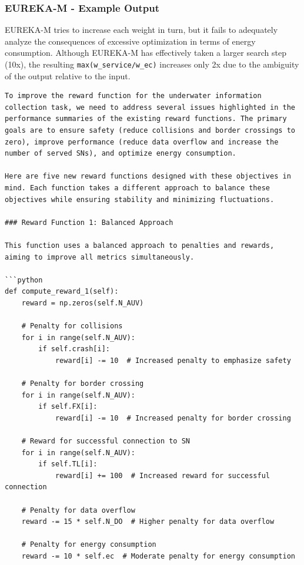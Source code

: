 \documentclass{article}
\begin{document}
\subsubsection{EUREKA-M - Example Output}
EUREKA-M tries to increase each weight in turn, but it fails to adequately analyze the consequences of excessive optimization in terms of energy consumption. Although EUREKA-M has effectively taken a larger search step (10x), the resulting \verb|max(w_service/w_ec)| increases only 2x due to the ambiguity of the output relative to the input.

\begin{verbatim}
To improve the reward function for the underwater information collection task, we need to address several issues highlighted in the performance summaries of the existing reward functions. The primary goals are to ensure safety (reduce collisions and border crossings to zero), improve performance (reduce data overflow and increase the number of served SNs), and optimize energy consumption.

Here are five new reward functions designed with these objectives in mind. Each function takes a different approach to balance these objectives while ensuring stability and minimizing fluctuations.

### Reward Function 1: Balanced Approach

This function uses a balanced approach to penalties and rewards, aiming to improve all metrics simultaneously.

```python
def compute_reward_1(self):
    reward = np.zeros(self.N_AUV)
    
    # Penalty for collisions
    for i in range(self.N_AUV):
        if self.crash[i]:
            reward[i] -= 10  # Increased penalty to emphasize safety

    # Penalty for border crossing
    for i in range(self.N_AUV):
        if self.FX[i]:
            reward[i] -= 10  # Increased penalty for border crossing

    # Reward for successful connection to SN
    for i in range(self.N_AUV):
        if self.TL[i]:
            reward[i] += 100  # Increased reward for successful connection

    # Penalty for data overflow
    reward -= 15 * self.N_DO  # Higher penalty for data overflow

    # Penalty for energy consumption
    reward -= 10 * self.ec  # Moderate penalty for energy consumption


\end{verbatim}
\end{document}
